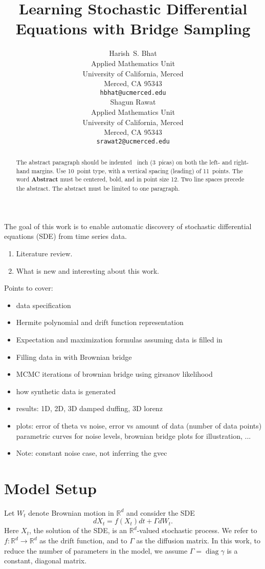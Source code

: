 \documentclass{article}
\title{Learning Stochastic Differential Equations with Bridge Sampling}
\author{
 Harish~S. Bhat\\
 Applied Mathematics Unit\\
 University of California, Merced\\
 Merced, CA 95343\\
 \texttt{hbhat@ucmerced.edu} \\
 \And
 Shagun Rawat\\
 Applied Mathematics Unit\\
 University of California, Merced\\
 Merced, CA 95343\\
 \texttt{srawat2@ucmerced.edu}
}
\newcommand{\opdiag}{\ensuremath{\operatorname{diag}}}
\begin{document}
\maketitle

\begin{abstract}
  The abstract paragraph should be indented ~inch
  (3~picas) on both the left- and right-hand margins. Use 10~point
  type, with a vertical spacing (leading) of 11~points.  The word
  \textbf{Abstract} must be centered, bold, and in point size 12. Two
  line spaces precede the abstract. The abstract must be limited to
  one paragraph.
\end{abstract}

The goal of this work is to enable automatic discovery of stochastic differential equations (SDE) from time series data.  

\begin{enumerate}
\item Literature review.
\item What is new and interesting about this work.
\end{enumerate}

Points to cover:
\begin{itemize}
\item data specification
\item Hermite polynomial and drift function representation
\item Expectation and maximization formulas assuming data is filled in
\item Filling data in with Brownian bridge
\item MCMC iterations of brownian bridge using girsanov likelihood
\item how synthetic data is generated
\item results: 1D, 2D, 3D damped duffing, 3D lorenz
\item plots: error of theta vs noise, error vs amount of data (number of data points) parametric curves for noise levels, brownian bridge plots for illustration, ...
\item Note: constant noise case, not inferring the gvec
\end{itemize}

\section{Model Setup}
Let $W_t$ denote Brownian motion in $\mathbb{R}^d$ and consider the SDE
\begin{equation} \label{eqn:sde}
d X_t = f( X_t) dt + \Gamma d W_t.
\end{equation}
Here $X_t$, the solution of the SDE, is an $\mathbb{R}^d$-valued stochastic process.  We refer to $f : \mathbb{R}^d \to \mathbb{R}^d$ as the drift function, and to $\Gamma$ as the diffusion matrix.  In this work, to reduce the number of parameters in the model, we assume $\Gamma = \opdiag \gamma$ is a constant, diagonal matrix.
\end{document}
